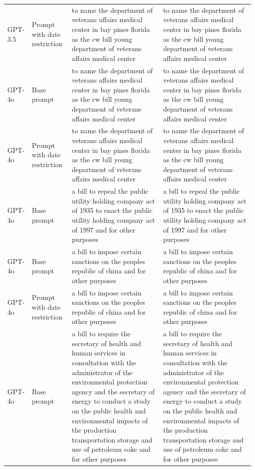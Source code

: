 \begin{longtable}{>{\raggedright\arraybackslash}p{1.4cm}>{\raggedright\arraybackslash}p{1.4cm}>{\raggedright\arraybackslash}p{5.5cm}>{\raggedright\arraybackslash}p{5.5cm}}
GPT-3.5 & Prompt with date restriction & to name the department of veterans affairs medical center in bay pines florida as the cw bill young department of veterans affairs medical center & to name the department of veterans affairs medical center in bay pines florida as the cw bill young department of veterans affairs medical center\\
GPT-4o & Base prompt & to name the department of veterans affairs medical center in bay pines florida as the cw bill young department of veterans affairs medical center & to name the department of veterans affairs medical center in bay pines florida as the cw bill young department of veterans affairs medical center\\
GPT-4o & Prompt with date restriction & to name the department of veterans affairs medical center in bay pines florida as the cw bill young department of veterans affairs medical center & to name the department of veterans affairs medical center in bay pines florida as the cw bill young department of veterans affairs medical center\\
GPT-4o & Base prompt & a bill to repeal the public utility holding company act of 1935 to enact the public utility holding company act of 1997 and for other purposes & a bill to repeal the public utility holding company act of 1935 to enact the public utility holding company act of 1997 and for other purposes\\
GPT-4o & Base prompt & a bill to impose certain sanctions on the peoples republic of china and for other purposes & a bill to impose certain sanctions on the peoples republic of china and for other purposes\\
GPT-4o & Prompt with date restriction & a bill to impose certain sanctions on the peoples republic of china and for other purposes & a bill to impose certain sanctions on the peoples republic of china and for other purposes\\
GPT-4o & Base prompt & a bill to require the secretary of health and human services in consultation with the administrator of the environmental protection agency and the secretary of energy to conduct a study on the public health and environmental impacts of the production transportation storage and use of petroleum coke and for other purposes & a bill to require the secretary of health and human services in consultation with the administrator of the environmental protection agency and the secretary of energy to conduct a study on the public health and environmental impacts of the production transportation storage and use of petroleum coke and for other purposes\\

\end{longtable}

